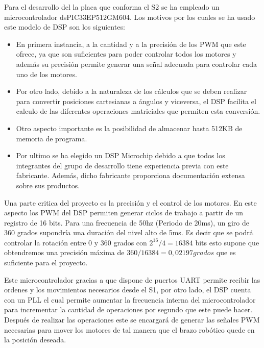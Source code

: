 Para el desarrollo del la placa que conforma el S2 se ha empleado un microcontrolador dsPIC33EP512GM604.
Los motivos por los cuales se ha usado este modelo de DSP son los siguientes: 

\begin{itemize}
\item En primera instancia, a la cantidad y a la precisión de los PWM que este ofrece, ya que son suficientes para poder controlar todos los motores y además su precisión permite generar una señal adecuada para controlar cada uno de los motores.

\item Por otro lado, debido a la naturaleza de los cálculos que se deben realizar para convertir posiciones cartesianas a ángulos y viceversa, el DSP facilita el calculo de las diferentes operaciones matriciales que permiten esta conversión.

\item Otro aspecto importante es la posibilidad de almacenar hasta 512KB de memoria de programa.

\item Por ultimo se ha elegido un DSP Microchip debido a que todos los integrantes del grupo de desarrollo tiene experiencia previa con este fabricante. Además, dicho fabricante proporciona documentación extensa sobre sus productos.

\end{itemize}

Una parte critica del proyecto es la precisión y el control de los motores. En este aspecto los PWM del DSP permiten generar ciclos de trabajo a partir de un registro de 16 bits. Para una frecuencia de 50hz (Periodo de 20ms), un giro de 360 grados supondría una duración del nivel alto de 5ms. Es decir que se podrá controlar la rotación entre 0 y 360 grados con $ 2^{16}/4 = 16384$ bits esto supone que obtendremos una precisión máxima de $360/16384 = 0,02197 grados$ que es suficiente para el proyecto.



Este microcontrolador gracias a que dispone de puertos UART permite recibir las ordenes y los movimientos necesarios desde el S1, por otro lado, el DSP cuenta con un PLL el cual permite aumentar la frecuencia interna del microcontrolador para incrementar la cantidad de operaciones por segundo que este puede hacer. Después de realizar las operaciones este se encargará de generar las señales PWM necesarias para mover los motores de tal manera que el brazo robótico quede en la posición deseada.





    
